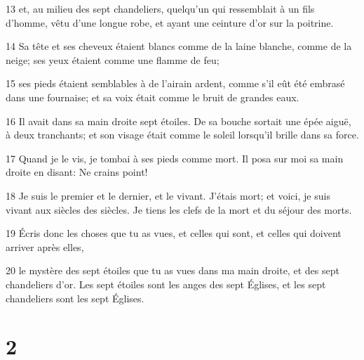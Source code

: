 \par 13 et, au milieu des sept chandeliers, quelqu'un qui ressemblait à un fils d'homme, vêtu d'une longue robe, et ayant une ceinture d'or sur la poitrine.
\par 14 Sa tête et ses cheveux étaient blancs comme de la laine blanche, comme de la neige; ses yeux étaient comme une flamme de feu;
\par 15 ses pieds étaient semblables à de l'airain ardent, comme s'il eût été embrasé dans une fournaise; et sa voix était comme le bruit de grandes eaux.
\par 16 Il avait dans sa main droite sept étoiles. De sa bouche sortait une épée aiguë, à deux tranchants; et son visage était comme le soleil lorsqu'il brille dans sa force.
\par 17 Quand je le vis, je tombai à ses pieds comme mort. Il posa sur moi sa main droite en disant: Ne crains point!
\par 18 Je suis le premier et le dernier, et le vivant. J'étais mort; et voici, je suis vivant aux siècles des siècles. Je tiens les clefs de la mort et du séjour des morts.
\par 19 Écris donc les choses que tu as vues, et celles qui sont, et celles qui doivent arriver après elles,
\par 20 le mystère des sept étoiles que tu as vues dans ma main droite, et des sept chandeliers d'or. Les sept étoiles sont les anges des sept Églises, et les sept chandeliers sont les sept Églises.

\chapter{2}

